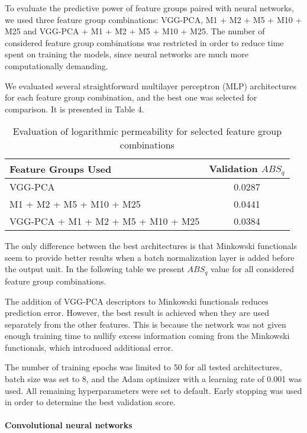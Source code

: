 \documentclass[review]{elsarticle}
\begin{document}
To evaluate the predictive power of feature groups paired with neural networks, we used three feature group combinations: VGG-PCA, M1 + M2 + M5 + M10 + M25 and VGG-PCA + M1 + M2 + M5 + M10 + M25. The number of considered feature group combinations was restricted in order to reduce time spent on training the models, since neural networks are much more computationally demanding.

We evaluated several straightforward multilayer perceptron (MLP) architectures for each feature group combination, and the best one was selected for comparison. It is presented in Table 4.

\begin{table}[H]
  \centering
  \caption{Evaluation of logarithmic permeability for selected feature group combinations} \label{tab:tab6}
  \begin{tabular}{ | l | c | }
    \hline
    Feature Groups Used & Validation $ABS_q$ \\ \hline
    VGG-PCA & 0.0287 \\ \hline
    M1 + M2 + M5 + M10 + M25 & 0.0441 \\ \hline
    VGG-PCA + M1 + M2 + M5 + M10 + M25 & 0.0384 \\ \hline
  \end{tabular}
\end{table}

The only difference between the best architectures is that Minkowski functionals seem to provide better results when a batch normalization layer is added before the output unit. In the following table we present $ABS_q$ value for all considered feature group combinations.

The addition of VGG-PCA descriptors to Minkowski functionals reduces prediction error. However, the best result is achieved when they are used separately from the other features. This is because the network was not given enough training time to nullify excess information coming from the Minkowski functionals, which introduced additional error.

The number of training epochs was limited to 50 for all tested architectures, batch size was set to 8, and the Adam optimizer with a learning rate of 0.001 was used. All remaining hyperparameters were set to default. Early stopping was used in order to determine the best validation score.

\paragraph{Convolutional neural networks}
\end{document}
